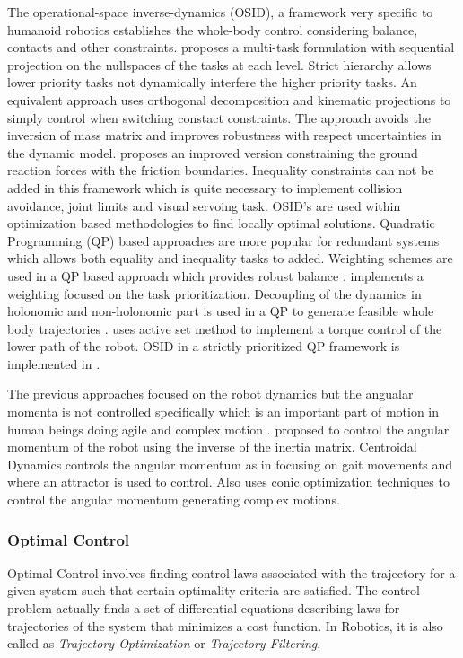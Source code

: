 The operational-space inverse-dynamics (OSID), a framework very specific to humanoid robotics establishes the whole-body control considering balance, contacts and other constraints. \cite{Khatib2004} proposes a multi-task formulation with sequential projection on  the nullspaces of the tasks at each level. Strict hierarchy allows lower priority tasks not dynamically interfere the higher priority tasks. An equivalent approach \cite{mistry2010inverse} uses orthogonal decomposition and kinematic projections to simply control when switching constact constraints. The approach avoids the inversion of mass matrix and improves robustness with respect uncertainties in the dynamic model. \cite{Righetti2011a,Righetti2011} proposes an improved version constraining the ground reaction forces with the friction boundaries. Inequality constraints can not be added in this framework which is quite necessary to implement collision avoidance, joint limits and visual servoing task. OSID's are used within optimization based methodologies to find locally optimal solutions. Quadratic Programming (QP) based approaches are more popular for redundant systems which allows both equality and inequality tasks to added. Weighting schemes are used in a QP based approach which provides robust balance \cite{collette2008robust}. \cite{Salini2011} implements a weighting focused on the task prioritization. Decoupling of the dynamics in holonomic and non-holonomic part is used in a QP to generate feasible whole body trajectories \cite{bouyarmane2012dynamics,wieber2006holonomy}. \cite{herzog2013experiments} uses active set method to implement a torque control of the lower path of the robot. OSID in a strictly prioritized QP framework is implemented in \cite{Saab2013}. 


The previous approaches focused on the robot dynamics but the angualar momenta is not controlled specifically which is an important part of motion in human beings doing agile and complex motion \cite{popovic2004angular}. \cite{kajita2003resolved} proposed to control the angular momentum of the robot using the inverse of the inertia matrix. Centroidal Dynamics controls the angular momentum as in \cite{hofmann2009exploiting} focusing on gait movements and \cite{moro2013attractor} where an attractor is used to control. Also \cite{wensing2013generation} uses conic optimization techniques to control the angular momentum generating complex motions.

\subsubsection{Optimal Control}
Optimal Control involves finding control laws associated with the trajectory for a given system such that certain optimality criteria
are satisfied. The control problem actually finds a set of differential equations describing laws for trajectories of the system that minimizes a cost function. In Robotics, it is also called as \textit{Trajectory Optimization} or \textit{Trajectory Filtering}.

